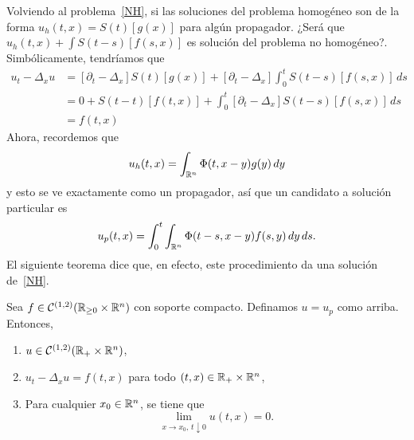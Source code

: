 \documentclass[../edp.tex]{subfiles}
\begin{document}
Volviendo al problema~\eqref{NH}, si las soluciones del problema
homogéneo son de la forma \(u_{h}(t,x) = S(t)[g(x)]\) para algún
propagador. ¿Será que \(u_{h}(t,x) + \int S(t-s)[f(s,x)]\) es solución
del problema no homogéneo?. Simbólicamente, tendríamos que
\begin{align*}
	u_t - \Delta_{x} u 
	&=
	[\partial_{t} - \Delta_{x}] S(t)[g(x)]
	+
	[\partial_{t} - \Delta_{x}] \int_{0}^{t} S(t-s)[f(s,x)]\, ds
	\\&=
	0 + S(t-t)[f(t, x)] + 
	\int_{0}^{t} [\partial_t - \Delta_x] S(t-s)[f(s,x)]\, ds
	\\&=
	f(t,x)
\end{align*}
Ahora, recordemos que 
\begin{displaymath}
	u_h(t,x)
	=
	\int_{\mathbb{R}^n} \Phi(t, x-y) g(y) \, dy
\end{displaymath}
y esto se ve exactamente como un propagador, así que un candidato a
solución particular es
\begin{displaymath}
	u_{p}(t,x)
	=
	\int_{0}^{t}
	\int_{\mathbb{R}^n} \Phi(t-s, x-y) f(s,y) \, dy\, ds.
\end{displaymath}
El siguiente teorema dice que, en efecto, este procedimiento da una
solución de~\eqref{NH}.

\begin{Teorema}
	Sea \(f\in \mathcal{C}^{(1,2)}(\mathbb{R}_{\ge 0} \times \mathbb{R}^n)\) con soporte
	compacto. Definamos \(u = u_{p}\) como arriba. Entonces,
	\begin{enumerate}[topsep=5pt,itemsep=2pt]
		\item \(u\in \mathcal{C}^{(1,2)}(\mathbb{R}_{+}\times\mathbb{R}^n)\),
		\item \(u_{t} - \Delta_{x} u = f(t,x)\) para todo \((t,x) \in
		\mathbb{R}_{+}\times \mathbb{R}^n\),
		\item Para cualquier \(x_0 \in \mathbb{R}^n\), se tiene que
		\begin{displaymath}
			\lim_{x\to x_0,\, t\downarrow 0} u(t,x) = 0.
		\end{displaymath}
	\end{enumerate}
\end{Teorema}
\begin{Demostracion}
\end{Demostracion}
\end{document}
